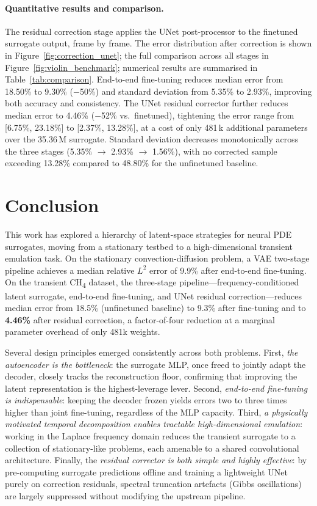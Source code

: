 \documentclass[a4paper, twocolumn]{article}
\begin{document}
\paragraph{Quantitative results and comparison.}
The residual correction stage applies the UNet post-processor to the finetuned surrogate output, frame by frame. The error distribution after correction is shown in Figure~\ref{fig:correction_unet}; the full comparison across all stages in Figure~\ref{fig:violin_benchmark}; numerical results are summarised in Table~\ref{tab:comparison}. End-to-end fine-tuning reduces median error from 18.50\% to 9.30\% ($-$50\%) and standard deviation from 5.35\% to 2.93\%, improving both accuracy and consistency. The UNet residual corrector further reduces median error to 4.46\% ($-$52\% vs.\ finetuned), tightening the error range from [6.75\%, 23.18\%] to [2.37\%, 13.28\%], at a cost of only 481\,k additional parameters over the 35.36\,M surrogate. Standard deviation decreases monotonically across the three stages (5.35\% $\to$ 2.93\% $\to$ 1.56\%), with no corrected sample exceeding 13.28\% compared to 48.80\% for the unfinetuned baseline.

\section{Conclusion}

This work has explored a hierarchy of latent-space strategies for neural PDE surrogates, moving from a stationary testbed to a high-dimensional transient emulation task. On the stationary convection-diffusion problem, a VAE two-stage pipeline achieves a median relative $L^2$ error of 9.9\% after end-to-end fine-tuning. On the transient CH\textsubscript{4} dataset, the three-stage pipeline—frequency-conditioned latent surrogate, end-to-end fine-tuning, and UNet residual correction—reduces median error from 18.5\% (unfinetuned baseline) to 9.3\% after fine-tuning and to \textbf{4.46\%} after residual correction, a factor-of-four reduction at a marginal parameter overhead of only 481k weights.

Several design principles emerged consistently across both problems. First, \emph{the autoencoder is the bottleneck}: the surrogate MLP, once freed to jointly adapt the decoder, closely tracks the reconstruction floor, confirming that improving the latent representation is the highest-leverage lever. Second, \emph{end-to-end fine-tuning is indispensable}: keeping the decoder frozen yields errors two to three times higher than joint fine-tuning, regardless of the MLP capacity. Third, \emph{a physically motivated temporal decomposition enables tractable high-dimensional emulation}: working in the Laplace frequency domain reduces the transient surrogate to a collection of stationary-like problems, each amenable to a shared convolutional architecture. Finally, the \emph{residual corrector is both simple and highly effective}: by pre-computing surrogate predictions offline and training a lightweight UNet purely on correction residuals, spectral truncation artefacts (Gibbs oscillations) are largely suppressed without modifying the upstream pipeline.
\end{document}

